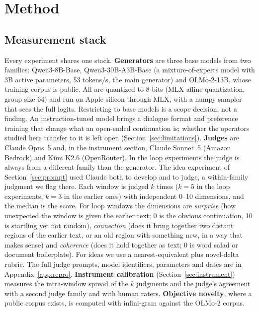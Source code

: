 \section{Method}
\label{sec:method}

\subsection{Measurement stack}
\label{sec:stack}

Every experiment shares one stack. \textbf{Generators} are three base models
from two families: Qwen3-8B-Base, Qwen3-30B-A3B-Base (a mixture-of-experts
model with 3B active parameters, 53 tokens/s, the main generator) and
OLMo-2-13B, whose training corpus is public. All are quantized to 8 bits
(MLX affine quantization, group size 64) and run on Apple silicon through
MLX, with a numpy sampler that sees the full logits. Restricting to base
models is a scope decision, not a finding. An instruction-tuned model brings
a dialogue format and preference training that change what an open-ended
continuation is; whether the operators studied here transfer to it is left
open (Section~\ref{sec:limitations}). \textbf{Judges} are Claude Opus~5 and,
in the instrument section, Claude Sonnet~5 (Amazon Bedrock) and Kimi K2.6
(OpenRouter). In the loop experiments the judge is always from a different
family than the generator. The idea experiment of Section~\ref{sec:prompt}
used Claude both to develop and to judge, a within-family judgment we flag
there. Each window is judged $k$ times ($k=5$ in the loop experiments, $k=3$
in the earlier ones) with independent 0--10 dimensions, and the median is
the score. For loop windows the dimensions are \emph{surprise} (how
unexpected the window is given the earlier text; 0 is the obvious
continuation, 10 is startling yet not random), \emph{connection} (does it
bring together two distant regions of the earlier text, or an old region
with something new, in a way that makes sense) and \emph{coherence} (does it
hold together as text; 0 is word salad or document boilerplate). For ideas
we use a nearest-equivalent plus novel-delta rubric. The full judge prompts,
model identifiers, parameters and dates are in Appendix~\ref{app:repro}.
\textbf{Instrument calibration} (Section~\ref{sec:instrument}) measures the
intra-window spread of the $k$ judgments and the judge's agreement with a
second judge family and with human raters. \textbf{Objective novelty},
where a public corpus exists, is computed with infini-gram
\citep{liu2024infinigram} against the OLMo-2 corpus.


